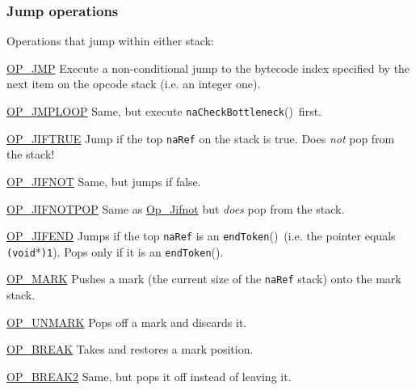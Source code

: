 \documentclass{article}
\newcommand{\todo}[1]{}
\newcommand{\type}[1]{\textcolor{type}{\tt #1}}
\newcommand{\func}[1]{\textcolor{func}{\tt #1}}
\newcommand{\OP} [1]{\hyperref[op:#1]{\textcolor{opcode}{OP\_#1}}}
\newcommand{\Op} [1]{\hyperref[op:#1]{\textcolor{opcode}{\sc Op\_#1}}}
\newcommand{\fp}{\textcolor{func}{()}}
\begin{document}
\subsubsection{Jump operations}
\todo{should this be renamed BRANCHING and should we differentiate here between unconditional and conditional branching ?}
Operations that jump within either stack:
\begin{description}
    \item \OP{JMP}    \label{op:JMP}\label{op:Jmp} Execute a non-conditional jump to the bytecode index specified by the next item on the opcode stack (i.e. an integer one).
    \item \OP{JMPLOOP}\label{op:JMPLOOP}\label{op:Jmploop} Same, but execute \func{naCheckBottleneck}\fp\ first.
    \item \OP{JIFTRUE}\label{op:JIFTRUE}\label{op:Jiftrue} Jump if the top \type{naRef} on the stack is true.  Does {\it not} pop from the stack!
    \item \OP{JIFNOT} \label{op:JIFNOT}\label{op:Jifnot} Same, but jumps if false.
    \item \OP{JIFNOTPOP}\label{op:JIFNOTPOP}\label{op:Jifnotpop} Same as \Op{Jifnot} but \emph{does} pop from the stack.
    \item \OP{JIFEND} \label{op:JIFEND}\label{op:Jifend} Jumps if the top \type{naRef} is an \func{endToken}\fp\ (i.e. the pointer equals \verb$($\type{void}*\verb$)1$).  Pops only if it is an \func{endToken}\fp.
    \item \OP{MARK}   \label{op:MARK}\label{op:Mark} Pushes a mark (the current size of the \type{naRef} stack) onto the mark stack.
    \item \OP{UNMARK} \label{op:UNMARK}\label{op:Unmark} Pops off a mark and discards it.
    \item \OP{BREAK}  \label{op:BREAK}\label{op:Break}   Takes and restores a mark position.
    \item \OP{BREAK2} \label{op:BREAK2}\label{op:Break2} Same, but pops it off instead of leaving it.
\end{description}
\end{document}
